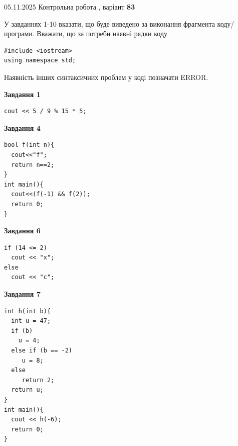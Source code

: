 \documentclass[12pt, ukrainian]{article}
\begin{document}
{\Large{05.11.2025 Контрольна робота , варіант  \No \textbf { 83 }\par}}
{
\begin {large}
У завданнях 1-10 вказати, що буде виведено за виконання фрагмента коду/про\-гра\-ми.
Вважати, що за потреби наявні рядки коду
\begin{verbatim}
#include <iostream>
using namespace std;
\end{verbatim}
Наявність інших синтаксичних проблем у коді позначати ERROR.

\begin{minipage}[t]{7.0cm}

\begin{center}
\textbf{Завдання 1}
\end{center}
\vspace{-8mm}

\begin{verbatim}
cout << 5 / 9 % 15 * 5;
\end{verbatim}



\begin{center}
\textbf{Завдання 4}
\end{center}
\vspace{-8mm}

\begin{verbatim}
bool f(int n){
  cout<<"f";
  return n==2;
}
int main(){
  cout<<(f(-1) && f(2));
  return 0;
}
\end{verbatim}



\begin{center}
\textbf{Завдання 6}
\end{center}
\vspace{-8mm}

\begin{verbatim}
if (14 <= 2)
  cout << "x";
else
  cout << "c";
\end{verbatim}



\begin{center}
\textbf{Завдання 7}
\end{center}
\vspace{-8mm}

\begin{verbatim}
int h(int b){
  int u = 47;
  if (b)
    u = 4;
  else if (b == -2)
     u = 8;
  else
     return 2;
  return u;
}
int main(){
  cout << h(-6);
  return 0;
}
\end{verbatim}


\end{minipage}
\end{large}}
\end{document}
